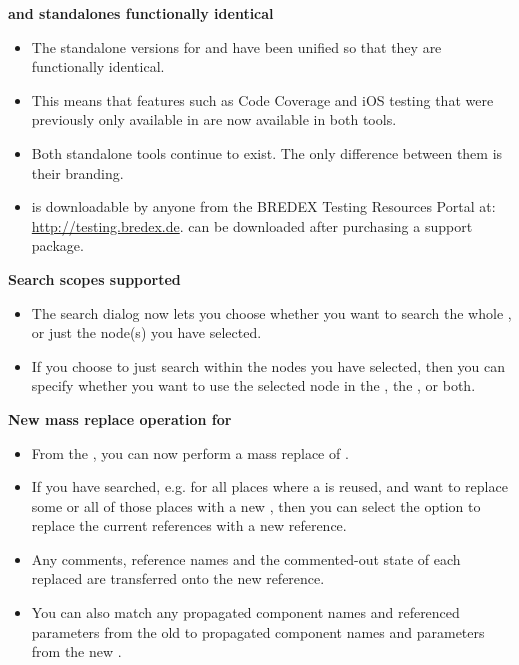 \textbf{\jb{} and \gd{} standalones functionally identical}
\begin{itemize}
\item The standalone versions for \jb{} and \gd{} have been unified so that they are functionally identical.
\item This means that features such as Code Coverage and iOS testing that were previously only available in \gd{} are now available in both tools. 
\item Both standalone tools continue to exist. The only difference between them is their branding. 
\item \jb{} is downloadable by anyone from the BREDEX Testing Resources Portal at: \url{http://testing.bredex.de}. \gd{} can be downloaded after purchasing a support package.
\end{itemize}

\textbf{Search scopes supported}
\begin{itemize}
\item The search dialog now lets you choose whether you want to search the whole \gdproject{}, or just the node(s) you have selected. 
\item If you choose to just search within the nodes you have selected, then you can specify whether you want to use the selected node in the \gdtestsuitebrowser{}, the \gdtestcasebrowser{}, or both. 
\end{itemize}

\textbf{New mass replace operation for \gdcases{}}
\begin{itemize}
\item From the \gdsearchresultview{}, you can now perform a mass replace of \gdcases{}. 
\item If you have searched, e.g. for all places where a \gdcase{} is reused, and want to replace some or all of those places with a new \gdcase{}, then you can select the option to replace the current \gdcase{} references with a new \gdcase{} reference. 
\item Any comments, \gdcase{} reference names and the commented-out state of each replaced \gdcase{} are transferred onto the new \gdcase{} reference. 
\item You can also match any propagated component names and referenced parameters from the old \gdcase{} to propagated component names and parameters from the new \gdcase{}. 
\end{itemize}

